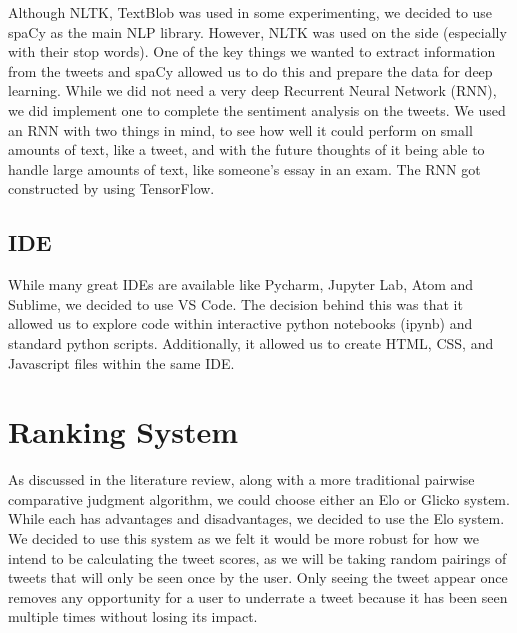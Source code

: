 	
	
	Although NLTK, TextBlob was used in some experimenting, we decided to use spaCy as the main NLP library. However, NLTK was used on the side (especially with their stop words). One of the key things we wanted to extract information from the tweets and spaCy allowed us to do this and prepare the data for deep learning. While we did not need a very deep Recurrent Neural Network (RNN), we did implement one to complete the sentiment analysis on the tweets. We used an RNN with two things in mind, to see how well it could perform on small amounts of text, like a tweet, and with the future thoughts of it being able to handle large amounts of text, like someone's essay in an exam. The RNN got constructed by using TensorFlow.
	
	\subsection{IDE}
	While many great IDEs are available like Pycharm, Jupyter Lab, Atom and Sublime, we decided to use VS Code. The decision behind this was that it allowed us to explore code within interactive python notebooks (ipynb) and standard python scripts. Additionally, it allowed us to create HTML, CSS, and Javascript files within the same IDE.
	
	
	\section{Ranking System}
	
	As discussed in the literature review, along with a more traditional pairwise comparative judgment algorithm, we could choose either an Elo or Glicko system. While each has advantages and disadvantages, we decided to use the Elo system. We decided to use this system as we felt it would be more robust for how we intend to be calculating the tweet scores, as we will be taking random pairings of tweets that will only be seen once by the user. Only seeing the tweet appear once removes any opportunity for a user to underrate a tweet because it has been seen multiple times without losing its impact. 
	
